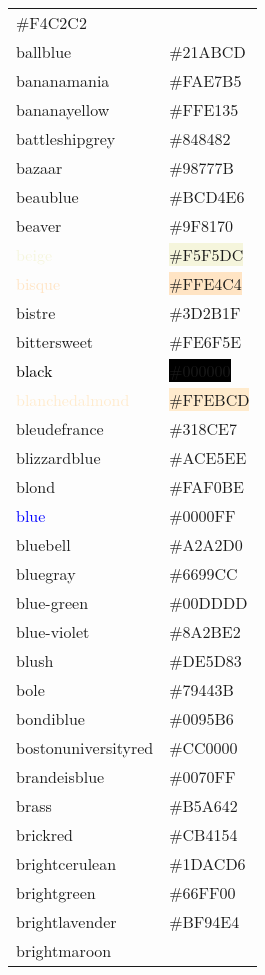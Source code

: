 \documentclass[
]{article}
\begin{document}
\begin{longtable}[]{@{}ll@{}}
\colorbox{babypink}{\#F4C2C2}\tabularnewline
\textcolor{ballblue}{ballblue} &
\colorbox{ballblue}{\#21ABCD}\tabularnewline
\textcolor{bananamania}{bananamania} &
\colorbox{bananamania}{\#FAE7B5}\tabularnewline
\textcolor{bananayellow}{bananayellow} &
\colorbox{bananayellow}{\#FFE135}\tabularnewline
\textcolor{battleshipgrey}{battleshipgrey} &
\colorbox{battleshipgrey}{\#848482}\tabularnewline
\textcolor{bazaar}{bazaar} & \colorbox{bazaar}{\#98777B}\tabularnewline
\textcolor{beaublue}{beaublue} &
\colorbox{beaublue}{\#BCD4E6}\tabularnewline
\textcolor{beaver}{beaver} & \colorbox{beaver}{\#9F8170}\tabularnewline
\textcolor{beige}{beige} & \colorbox{beige}{\#F5F5DC}\tabularnewline
\textcolor{bisque}{bisque} & \colorbox{bisque}{\#FFE4C4}\tabularnewline
\textcolor{bistre}{bistre} & \colorbox{bistre}{\#3D2B1F}\tabularnewline
\textcolor{bittersweet}{bittersweet} &
\colorbox{bittersweet}{\#FE6F5E}\tabularnewline
\textcolor{black}{black} & \colorbox{black}{\#000000}\tabularnewline
\textcolor{blanchedalmond}{blanchedalmond} &
\colorbox{blanchedalmond}{\#FFEBCD}\tabularnewline
\textcolor{bleudefrance}{bleudefrance} &
\colorbox{bleudefrance}{\#318CE7}\tabularnewline
\textcolor{blizzardblue}{blizzardblue} &
\colorbox{blizzardblue}{\#ACE5EE}\tabularnewline
\textcolor{blond}{blond} & \colorbox{blond}{\#FAF0BE}\tabularnewline
\textcolor{blue}{blue} & \colorbox{ao}{\#0000FF}\tabularnewline
\textcolor{bluebell}{bluebell} &
\colorbox{bluebell}{\#A2A2D0}\tabularnewline
\textcolor{bluegray}{bluegray} &
\colorbox{bluegray}{\#6699CC}\tabularnewline
\textcolor{blue-green}{blue-green} &
\colorbox{blue-green}{\#00DDDD}\tabularnewline
\textcolor{blue-violet}{blue-violet} &
\colorbox{blue-violet}{\#8A2BE2}\tabularnewline
\textcolor{blush}{blush} & \colorbox{blush}{\#DE5D83}\tabularnewline
\textcolor{bole}{bole} & \colorbox{bole}{\#79443B}\tabularnewline
\textcolor{bondiblue}{bondiblue} &
\colorbox{bondiblue}{\#0095B6}\tabularnewline
\textcolor{bostonuniversityred}{bostonuniversityred} &
\colorbox{bostonuniversityred}{\#CC0000}\tabularnewline
\textcolor{brandeisblue}{brandeisblue} &
\colorbox{brandeisblue}{\#0070FF}\tabularnewline
\textcolor{brass}{brass} & \colorbox{brass}{\#B5A642}\tabularnewline
\textcolor{brickred}{brickred} &
\colorbox{brickred}{\#CB4154}\tabularnewline
\textcolor{brightcerulean}{brightcerulean} &
\colorbox{brightcerulean}{\#1DACD6}\tabularnewline
\textcolor{brightgreen}{brightgreen} &
\colorbox{brightgreen}{\#66FF00}\tabularnewline
\textcolor{brightlavender}{brightlavender} &
\colorbox{brightlavender}{\#BF94E4}\tabularnewline
\textcolor{brightmaroon}{brightmaroon} &

\end{longtable}
\end{document}
